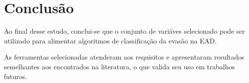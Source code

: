 \chapter{Conclusão}

Ao final desse estudo, conclui-se que o conjunto de variáves selecionado pode
ser utilizado para alimentar algoritmos de classificação da evasão na EAD.

As ferramentas selecionadas atenderam aos requisitos e apresentaram resultados
semelhantes aos encontrados na literatura, o que valida seu uso em trabalhos
futuros.

